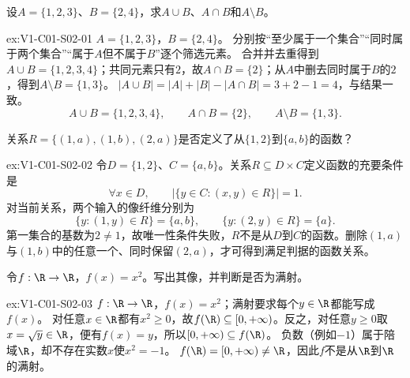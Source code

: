\begin{SLChapterExercisePairSection}
\begin{exercise}[集合运算]\label{ex:V1-C01-S02-01}
设$A=\{1,2,3\}$、$B=\{2,4\}$，求$A\cup B$、$A\cap B$和$A\setminus B$。
\end{exercise}
\label{sol:V1-C01-S02-01}
\begin{chapterexercisesolution}{ex:V1-C01-S02-01}
\SolGiven $A=\{1,2,3\}$，$B=\{2,4\}$。
\SolPlan 分别按“至少属于一个集合”“同时属于两个集合”“属于$A$但不属于$B$”逐个筛选元素。
\SolDerive 合并并去重得到$A\cup B=\{1,2,3,4\}$；共同元素只有$2$，故$A\cap B=\{2\}$；从$A$中删去同时属于$B$的$2$，得到$A\setminus B=\{1,3\}$。
\SolCheck $|A\cup B|=|A|+|B|-|A\cap B|=3+2-1=4$，与结果一致。
\SolAnswer
\[
A\cup B=\{1,2,3,4\},\qquad A\cap B=\{2\},\qquad A\setminus B=\{1,3\}.
\]
\end{chapterexercisesolution}

\begin{exercise}[函数判定]\label{ex:V1-C01-S02-02}
关系$R=\{(1,a),(1,b),(2,a)\}$是否定义了从$\{1,2\}$到$\{a,b\}$的函数？
\end{exercise}
\label{sol:V1-C01-S02-02}
\begin{chapterexercisesolution}{ex:V1-C01-S02-02}
令$D=\{1,2\}$、$C=\{a,b\}$。关系$R\subseteq D\times C$定义函数的充要条件是
\[
\forall x\in D,\qquad
\left|\{y\in C:(x,y)\in R\}\right|=1.
\]
对当前关系，两个输入的像纤维分别为
\[
\{y:(1,y)\in R\}=\{a,b\},\qquad
\{y:(2,y)\in R\}=\{a\}.
\]
第一集合的基数为$2\ne1$，故唯一性条件失败，$R$不是从$D$到$C$的函数。删除$(1,a)$与$(1,b)$中的任意一个、同时保留$(2,a)$，才可得到满足判据的函数关系。
\end{chapterexercisesolution}

\begin{exercise}[像与陪域]\label{ex:V1-C01-S02-03}
令$f:\R\to\R$，$f(x)=x^2$。写出其像，并判断是否为满射。
\end{exercise}
\label{sol:V1-C01-S02-03}
\begin{chapterexercisesolution}{ex:V1-C01-S02-03}
\SolGiven $f:\R\to\R$，$f(x)=x^2$；满射要求每个$y\in\R$都能写成$f(x)$。
\SolDerive 对任意$x\in\R$都有$x^2\ge0$，故$f(\R)\subseteq[0,+\infty)$。反之，对任意$y\ge0$取$x=\sqrt y\in\R$，便有$f(x)=y$，所以$[0,+\infty)\subseteq f(\R)$。
\SolCheck 负数（例如$-1$）属于陪域$\R$，却不存在实数$x$使$x^2=-1$。
\SolAnswer $f(\R)=[0,+\infty)\ne\R$，因此$f$不是从$\R$到$\R$的满射。
\end{chapterexercisesolution}


\end{SLChapterExercisePairSection}
